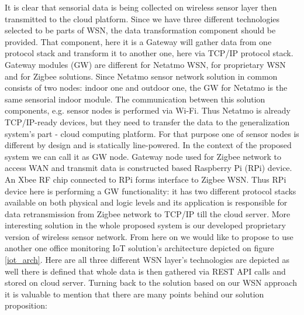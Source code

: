 \documentclass[journal]{IEEEtran}
\begin{document}
It is clear that sensorial data is being collected on wireless sensor layer then transmitted to the cloud platform. Since we have three different technologies selected to be parts of WSN, the data transformation component should be provided. That component, here it is a Gateway will gather data from one protocol stack and transform it to another one, here via TCP/IP protocol stack. Gateway modules (GW) are different for Netatmo WSN, for proprietary WSN and for Zigbee solutions. Since Netatmo sensor network solution in common consists of two nodes: indoor one and outdoor one, the GW for Netatmo is the same sensorial indoor module. The communication between this solution components, e.g. sensor nodes is performed via Wi-Fi. Thus Netatmo is already TCP/IP-ready devices, but they need to transfer the data to the generalization system's part - cloud computing platform. For that purpose one of sensor nodes is different by design and is statically line-powered. In the context of the proposed system we can call it as GW node. Gateway node used for Zigbee network to access WAN and transmit data is constructed based Raspberry Pi (RPi) device. An Xbee RF chip \cite{Xbee_chip} connected to RPi forms interface to Zigbee WSN. Thus RPi device here is performing a GW functionality: it has two different protocol stacks available on both physical and logic levels and its application is responsible for data retransmission from Zigbee network to TCP/IP till the cloud server. More interesting solution in the whole proposed system is our developed proprietary version of wireless sensor network. From here on we would like to propose to use another one office monitoring IoT solution's architecture depicted on figure \ref{iot_arch}. Here are all three different WSN layer's technologies are depicted as well there is defined that whole data is then gathered via REST API calls and stored on cloud server. Turning back to the solution based on our WSN approach it is valuable to mention that there are many points behind our solution proposition:
\end{document}
